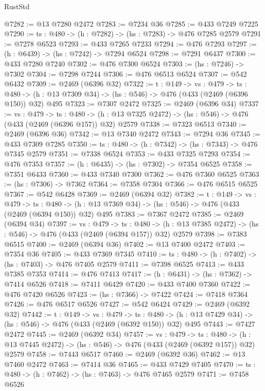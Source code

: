 \begin{lexlean}{RustStd}
\begin{coremodule}
@7282 := @13 @7280 @2472
@7283 := @7234 @36
@7285 := @433 @7249 @7225
@7290 := {ts : @480} -> (h : @7282) -> (hs : @7283) -> @476 @7285 @2579
@7291 := @7278 @6523
@7293 := @433 @7265 @7233
@7294 := @476 @7293
@7297 := (h : @6439) -> (hs : @7242) -> @7294 @6524
@7298 := @7291 @6437
@7300 := @433 @7280 @7240
@7302 := @476 @7300 @6524
@7303 := (hs : @7246) -> @7302
@7304 := @7298 @7244
@7306 := @476 @6513 @6524
@7307 := @542 @6432
@7309 := @2469 (@6396 @32)
@7322 := {t : @149} ->
  {vs : @479} ->
  {ts : @480} -> (h : @13 @7309 @34) -> (hs : @546) -> @476 (@433 (@2469 (@6396 @150)) @32) @495
@7323 := @7307 @2472
@7325 := @2469 (@6396 @34)
@7337 := {vs : @479} ->
  {ts : @480} -> (h : @13 @7325 @2472) -> (hs : @546) -> @476 (@433 (@2469 (@6396 @157)) @32) @2579
@7338 := @7323 @6513
@7340 := @2469 (@6396 @36)
@7342 := @13 @7340 @2472
@7343 := @7294 @36
@7345 := @433 @7309 @7285
@7350 := {ts : @480} -> (h : @7342) -> (hs : @7343) -> @476 @7345 @2579
@7351 := @7338 @6524
@7353 := @433 @7325 @7293
@7354 := @476 @7353
@7357 := (h : @6435) -> (hs : @7302) -> @7354 @6525
@7358 := @7351 @6433
@7360 := @433 @7340 @7300
@7362 := @476 @7360 @6525
@7363 := (hs : @7306) -> @7362
@7364 := @7358 @7304
@7366 := @476 @6515 @6525
@7367 := @542 @6428
@7369 := @2469 (@6394 @32)
@7382 := {t : @149} ->
  {vs : @479} ->
  {ts : @480} -> (h : @13 @7369 @34) -> (hs : @546) -> @476 (@433 (@2469 (@6394 @150)) @32) @495
@7383 := @7367 @2472
@7385 := @2469 (@6394 @34)
@7397 := {vs : @479} ->
  {ts : @480} -> (h : @13 @7385 @2472) -> (hs : @546) -> @476 (@433 (@2469 (@6394 @157)) @32) @2579
@7398 := @7383 @6515
@7400 := @2469 (@6394 @36)
@7402 := @13 @7400 @2472
@7403 := @7354 @36
@7405 := @433 @7369 @7345
@7410 := {ts : @480} -> (h : @7402) -> (hs : @7403) -> @476 @7405 @2579
@7411 := @7398 @6525
@7413 := @433 @7385 @7353
@7414 := @476 @7413
@7417 := (h : @6431) -> (hs : @7362) -> @7414 @6526
@7418 := @7411 @6429
@7420 := @433 @7400 @7360
@7422 := @476 @7420 @6526
@7423 := (hs : @7366) -> @7422
@7424 := @7418 @7364
@7426 := @476 @6517 @6526
@7427 := @542 @6424
@7429 := @2469 (@6392 @32)
@7442 := {t : @149} ->
  {vs : @479} ->
  {ts : @480} -> (h : @13 @7429 @34) -> (hs : @546) -> @476 (@433 (@2469 (@6392 @150)) @32) @495
@7443 := @7427 @2472
@7445 := @2469 (@6392 @34)
@7457 := {vs : @479} ->
  {ts : @480} -> (h : @13 @7445 @2472) -> (hs : @546) -> @476 (@433 (@2469 (@6392 @157)) @32) @2579
@7458 := @7443 @6517
@7460 := @2469 (@6392 @36)
@7462 := @13 @7460 @2472
@7463 := @7414 @36
@7465 := @433 @7429 @7405
@7470 := {ts : @480} -> (h : @7462) -> (hs : @7463) -> @476 @7465 @2579
@7471 := @7458 @6526

\end{coremodule}
\end{lexlean}

